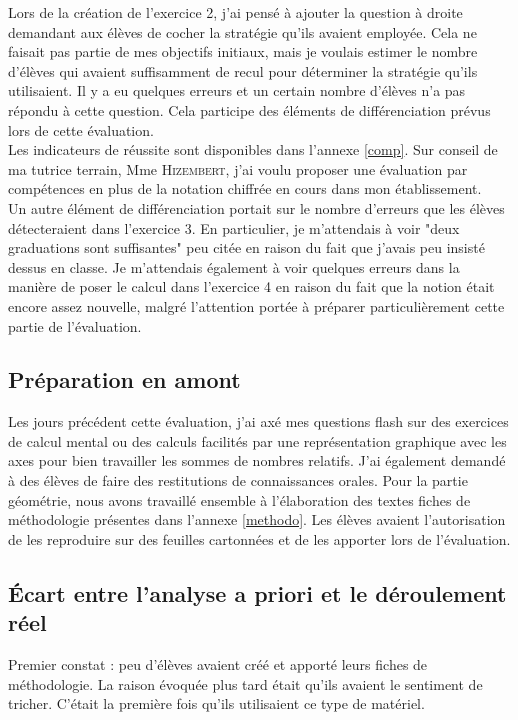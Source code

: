 Lors de la création de l'exercice 2, j'ai pensé à ajouter la question à droite demandant aux élèves de cocher la stratégie qu'ils avaient employée. Cela ne faisait pas partie de mes objectifs initiaux, mais je voulais estimer le nombre d'élèves qui avaient suffisamment de recul pour déterminer la stratégie qu'ils utilisaient. Il y a eu quelques erreurs et un certain nombre d'élèves n'a pas répondu à cette question. Cela participe des éléments de différenciation prévus lors de cette évaluation.\\

Les indicateurs de réussite sont disponibles dans l'annexe \ref{comp}. Sur conseil de ma tutrice terrain, Mme \textsc{Hizembert}, j'ai voulu proposer une évaluation par compétences en plus de la notation chiffrée en cours dans mon établissement.\\

Un autre élément de différenciation portait sur le nombre d'erreurs que les élèves détecteraient dans l'exercice 3. En particulier, je m'attendais à voir "deux graduations sont suffisantes" peu citée en raison du fait que j'avais peu insisté dessus en classe. Je m'attendais également à voir quelques erreurs dans la manière de poser le calcul dans l'exercice 4 en raison du fait que la notion était encore assez nouvelle, malgré l'attention portée à préparer particulièrement cette partie de l'évaluation.

\subsection{Préparation en amont}
Les jours précédent cette évaluation, j'ai axé mes questions flash sur des exercices de calcul mental ou des calculs facilités par une représentation graphique avec les axes pour bien travailler les sommes de nombres relatifs. J'ai également demandé à des élèves de faire des restitutions de connaissances orales.
Pour la partie géométrie, nous avons travaillé ensemble à l'élaboration des textes fiches de méthodologie présentes dans l'annexe \ref{methodo}. Les élèves avaient l'autorisation de les reproduire sur des feuilles cartonnées et de les apporter lors de l'évaluation.

\subsection{Écart entre l'analyse a priori et le déroulement réel}
Premier constat : peu d'élèves avaient créé et apporté leurs fiches de méthodologie. La raison évoquée plus tard était qu'ils avaient le sentiment de tricher. C'était la première fois qu'ils utilisaient ce type de matériel.\\

